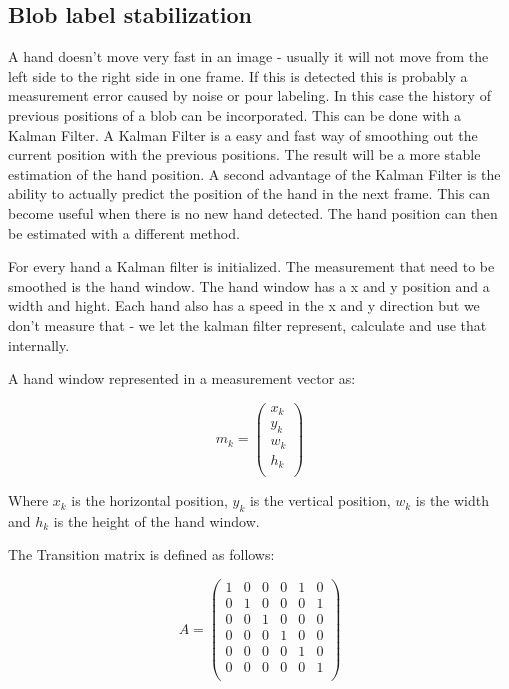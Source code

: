 \subsection*{Blob label stabilization}
A hand doesn't move very fast in an image - usually it will not move from the left side to the right side in one frame. If this is detected this is probably a measurement error caused by noise or pour labeling. In this case the history of previous positions of a blob can be incorporated. This can be done with a Kalman Filter. A Kalman Filter is a easy and fast way of smoothing out the current position with the previous positions. The result will be a more stable estimation of the hand position. A second advantage of the Kalman Filter is the ability to actually predict the position of the hand in the next frame. This can become useful when there is no new hand detected. The hand position can then be estimated with a different method.

For every hand a Kalman filter is initialized. The measurement that need to be smoothed is the hand window. The hand window has a x and y position and a width and hight. Each hand also has a speed in the x and y direction but we don't measure that - we let the kalman filter represent, calculate and use that internally. 

A hand window represented in a measurement vector as:

\[ m_k = \left(
\begin{array}{c}
	x_k \\ %
	y_k \\ %
	w_k \\ %
	h_k \\ %
\end{array} \right)\]

Where $x_k$ is the horizontal position, $y_k$ is the vertical position, $w_k$ is the width and $h_k$ is the height of the hand window.

The Transition matrix is defined as follows:

\[ A = \left(
\begin{array}{cccccc}
	1 & 0 & 0 & 0 & 1 & 0 \\
	0 & 1 & 0 & 0 & 0 & 1 \\
	0 & 0 & 1 & 0 & 0 & 0 \\
	0 & 0 & 0 & 1 & 0 & 0 \\
	0 & 0 & 0 & 0 & 1 & 0 \\
	0 & 0 & 0 & 0 & 0 & 1 \\
\end{array} \right)\] 


